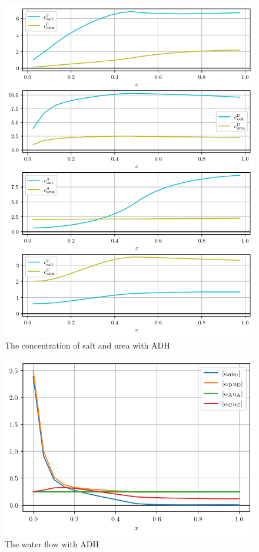 \documentclass{article}
\begin{document}
\begin{figure}
    \centering
    \includegraphics[width=.9\textwidth]{../results/4-7-2023/ADH_c.png}
    \caption{The concentration of salt and urea with ADH}
\end{figure}

\begin{figure}
    \centering
    \includegraphics[width=.9\textwidth]{../results/4-7-2023/ADH_flows.png}
    \caption{The water flow with ADH}
\end{figure}
\end{document}
